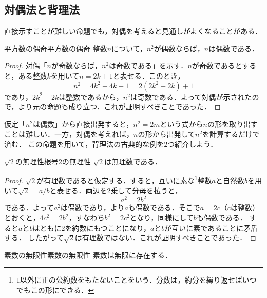 \subsection{対偶法と背理法}

直接示すことが難しい命題でも，対偶を考えると見通しがよくなることがある．

\begin{prop}{平方数の偶奇}{平方数の偶奇}
  整数$n$について，$n^2$が偶数ならば，$n$は偶数である．
\end{prop}

\begin{tleftbar}
  \begin{proof}
    対偶「$n$が奇数ならば，$n^2$は奇数である」を示す．$n$が奇数であるとすると，ある整数$k$を用いて$n = 2k + 1$と表せる．このとき，
    \[
      n^2 = 4k^2 + 4k + 1 = 2(2k^2 + 2k) + 1
    \]
    であり，$2k^2 + 2k$は整数であるから，$n^2$は奇数である．よって対偶が示されたので，より元の命題も成り立つ．これが証明すべきことであった．
  \end{proof}
\end{tleftbar}

仮定「$n^2$は偶数」から直接出発すると，$n^2 = 2m$という式から$n$の形を取り出すことは難しい．一方，対偶を考えれば，$n$の形から出発して$n^2$を計算するだけで済む．
この命題を用いて，背理法の古典的な例を$2$つ紹介しよう．

\begin{prop}{$\sqrt{2}$の無理性}{根号2の無理性}
  $\sqrt{2}$は無理数である．
\end{prop}

\begin{tleftbar}
  \begin{proof}
    $\sqrt{2}$が有理数であると仮定する．すると，互いに素な\footnote{$1$以外に正の公約数をもたないことをいう．分数は，約分を繰り返せばいつでもこの形にできる．}整数$a$と自然数$b$を用いて$\sqrt{2} = a/b$と表せる．両辺を$2$乗して分母を払うと，
    \[
      a^2 = 2b^2
    \]
    である．よって$a^2$は偶数であり，より$a$も偶数である．そこで$a = 2c$（$c$は整数）とおくと，$4c^2 = 2b^2$，すなわち$b^2 = 2c^2$となり，同様にして$b$も偶数である．
    すると$a$と$b$はともに$2$を約数にもつことになり，$a$と$b$が互いに素であることに矛盾する．
    したがって$\sqrt{2}$は有理数ではない．これが証明すべきことであった．
  \end{proof}
\end{tleftbar}

\begin{prop}{素数の無限性}{素数の無限性}
  素数は無限に存在する．
\end{prop}

